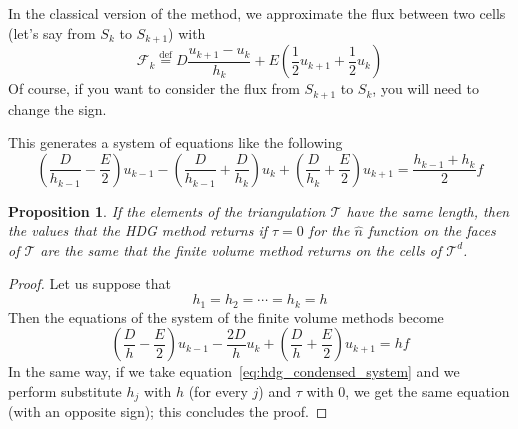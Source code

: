 \documentclass[a4paper,11pt, draft]{article}
\newtheorem{prop}{Proposition}
\newcommand{\Def}{\stackrel{\mathrm{def}}{=}}
\newcommand{\dualt}{\ensuremath{\mathcal{T}^d}}
\begin{document}
In the classical version of the method, we approximate the flux between two cells (let's say 
from $S_k$ to $S_{k+1}$) with
\[ \mathcal{F}_{k} \Def  D \frac{u_{k + 1} - u_k}{h_k} + E \left( \frac{1}{2} u_{k+1} + \frac{1}{2} 
u_k \right) \]
Of course, if you want to consider the flux from $S_{k+1}$ to $S_k$, you will need to change the 
sign.

This generates a system of equations like the following
\begin{equation}\label{eq:standard_fvm}
  \left(\frac{D}{h_{k - 1}} - \frac{E}{2} \right) {u_{k - 1}} 
    - {\left(\frac{D}{h_{k - 1}} + \frac{D}{h_{k}}\right)} u_{k}
    + \left(\frac{D}{h_{k}} + \frac{E}{2} \right) u_{k + 1}
    = \frac{h_{k - 1} + h_{k}}{2} f 
\end{equation}

\begin{prop} \label{hdg_vs_fvm}
 If the elements of the triangulation $\mathcal{T}$ have the same length, then the values that 
the HDG method returns if $\tau = 0$ for the $\widehat{n}$ function on the faces of $\mathcal{T}$ 
are the same that the finite volume method returns on the cells of \dualt.
\end{prop}

\begin{proof}
 Let us suppose that 
 \[ h_1 = h_2 = \cdots = h_k = h \]
 Then the equations of the system of the finite volume methods become
 \[
  \left(\frac{D}{h} - \frac{E}{2} \right) {u_{k - 1}} 
    - \frac{2D}{h} u_{k}
    + \left(\frac{D}{h} + \frac{E}{2} \right) u_{k + 1}
    = h f 
 \]
 In the same way, if we take equation~\ref{eq:hdg_condensed_system} and we perform substitute $h_j$ 
with $h$ (for every $j$) and $\tau$ with 0, we get the same equation (with an opposite sign); this 
concludes the proof.
\end{proof}
\end{document}
